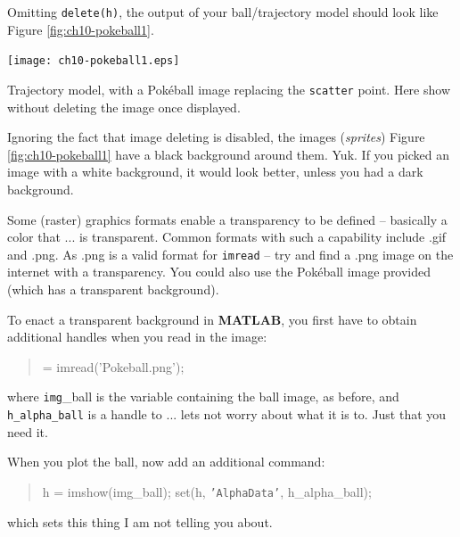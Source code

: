 \documentclass{tufte-book} %
\newenvironment{docspec}{\begin{quotation}\ttfamily\parskip0pt\parindent0pt\ignorespaces}{\end{quotation}}
\begin{document}
Omitting \texttt{delete(h)}, the output of your ball/trajectory model should look like Figure \ref{fig:ch10-pokeball1}.

\begin{marginfigure}[0.0in]
\texttt{[image: ch10-pokeball1.eps]}
\caption{Trajectory model, with a Pok\'eball image replacing the \texttt{scatter} point. Here show without deleting the image once displayed.}
\label{fig:ch10-pokeball1}
\end{marginfigure}

Ignoring the fact that image deleting is disabled, the images (\textit{sprites}) Figure \ref{fig:ch10-pokeball1} have a black background around them. Yuk. If you picked an image with a white background, it would look better, unless you had a dark background.

Some (raster) graphics formats enable a transparency to be defined -- basically a color that ... is transparent. Common formats with such a capability include \textsf{.gif} and \textsf{.png}. As \textsf{.png} is a valid format for \texttt{imread} -- try and find a \textsf{.png} image on the internet with a transparency. You could also use the Pok\'eball image provided (which has a transparent background).

To enact a transparent background in \textbf{MATLAB}, you first have to obtain additional handles when you read in the image:
\begin{docspec}
[img\_ball, h\_map\_ball, h\_alpha\_ball] = imread(\textcolor[rgb]{1,0,1}{'Pokeball.png'});
\end{docspec}
where \texttt{img}\_ball is the variable containing the ball image, as before, and \texttt{h\_alpha\_ball} is a handle to ... lets not worry about what it is to. Just that you need it.

When you plot the ball, now add an additional command:
\begin{docspec}
    h = imshow(img\_ball);
    set(h, \texttt{'AlphaData'}, h\_alpha\_ball);
\end{docspec}
which sets this thing I am not telling you about.
\end{document}

